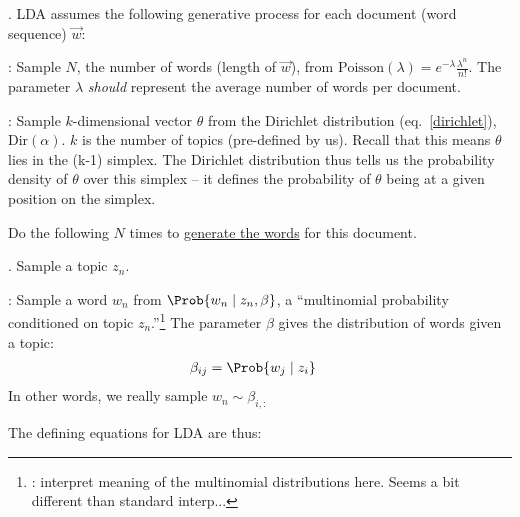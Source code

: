 \documentclass[11pt]{article}
\begin{document}
\myspace
\p {}. LDA assumes the following generative process for each document (word sequence) $\vec{w}$:
\begin{compactenum}
	\item {}: Sample $N$, the number of words (length of $\vec{w}$), from $\text{Poisson}(\lambda) = e^{-\lambda} \frac{\lambda^n}{n!}$. The parameter $\lambda$ \textit{should} represent the average number of words per document.
	
	\item {}: Sample $k$-dimensional vector $\theta$ from the Dirichlet distribution (eq.~\ref{dirichlet}), $\text{Dir}(\alpha)$. $k$ is the number of topics (pre-defined by us). Recall that this means $\theta$ lies in the (k-1) simplex. The Dirichlet distribution thus tells us the probability density of $\theta$ over this simplex -- it defines the probability of $\theta$ being at a given position on the simplex.
	
	\item Do the following $N$ times to \underline{generate the words} for this document.
	\begin{compactenum}
		\item {}. Sample a topic $z_n$.
		
		\item {}: Sample a word $w_n$ from $\Prob{w_n \mid z_n, \beta}$, a ``multinomial probability conditioned on topic $z_n$.''\footnote{: interpret meaning of the multinomial distributions here. Seems a bit different than standard interp...} The parameter $\beta$ gives the distribution of words given a topic: 	
		\begin{align}
		\beta_{ij} &= \Prob{w_j \mid z_i} 
		\end{align}
		In other words, we really sample $w_n \sim \beta_{i,:}$
	\end{compactenum}
\end{compactenum}
The defining equations for LDA are thus:
\end{document}
